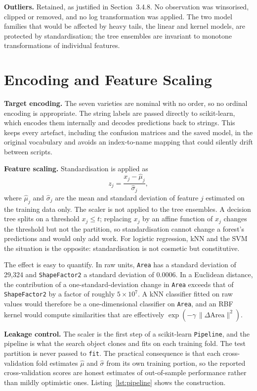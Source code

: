 \textbf{Outliers.} Retained, as justified in Section~3.4.8. No observation was
winsorised, clipped or removed, and no log transformation was applied. The two
model families that would be affected by heavy tails, the linear and
kernel models, are protected by standardisation; the tree ensembles are
invariant to monotone transformations of individual features.

\section{Encoding and Feature Scaling}

\textbf{Target encoding.} The seven varieties are nominal with no order, so no
ordinal encoding is appropriate. The string labels are passed directly to
scikit-learn, which encodes them internally and decodes predictions back to
strings. This keeps every artefact, including the confusion matrices and the saved
model, in the original vocabulary and avoids an index-to-name mapping that could
silently drift between scripts.

\textbf{Feature scaling.} Standardisation is applied as
\begin{equation}
  z_{j} = \frac{x_{j} - \hat{\mu}_{j}}{\hat{\sigma}_{j}},
  \label{eq:zscore}
\end{equation}
where $\hat{\mu}_{j}$ and $\hat{\sigma}_{j}$ are the mean and standard deviation
of feature $j$ estimated on the training data only. The scaler is not applied to
the tree ensembles. A decision tree splits on a threshold $x_j \le t$; replacing
$x_j$ by an affine function of $x_j$ changes the threshold but not the partition,
so standardisation cannot change a forest's predictions and would only add work.
For logistic regression, kNN and the SVM the situation is the opposite:
standardisation is not cosmetic but constitutive.

The effect is easy to quantify. In raw units, \texttt{Area} has a standard
deviation of 29,324 and \texttt{ShapeFactor2} a standard deviation of 0.0006. In a
Euclidean distance, the contribution of a one-standard-deviation change in
\texttt{Area} exceeds that of \texttt{ShapeFactor2} by a factor of roughly
$5\times10^{7}$. A kNN classifier fitted on raw values would therefore be a
one-dimensional classifier on \texttt{Area}, and an RBF kernel would compute
similarities that are effectively $\exp(-\gamma\,\|\Delta\text{Area}\|^2)$.

\textbf{Leakage control.} The scaler is the first step of a scikit-learn
\texttt{Pipeline}, and the pipeline is what the search object clones and fits on
each training fold. The test partition is never passed to \texttt{fit}. The
practical consequence is that each cross-validation fold estimates
$\hat{\mu}$ and $\hat{\sigma}$ from its own training portion, so the reported
cross-validation scores are honest estimates of out-of-sample performance rather
than mildly optimistic ones. Listing~\ref{lst:pipeline} shows the construction.

